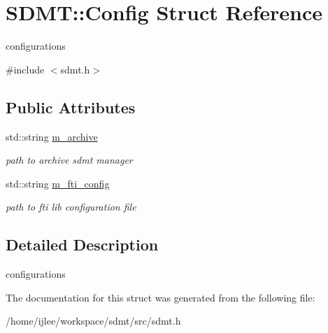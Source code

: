 \hypertarget{struct_s_d_m_t_1_1_config}{}\section{S\+D\+MT\+:\+:Config Struct Reference}
\label{struct_s_d_m_t_1_1_config}


configurations  




{\ttfamily \#include $<$sdmt.\+h$>$}

\subsection*{Public Attributes}
\begin{DoxyCompactItemize}
\item 
\mbox{\label{struct_s_d_m_t_1_1_config_a15ac2d93f153f5c3c3b557eb242bf43f}} 
std\+::string \hyperlink{struct_s_d_m_t_1_1_config_a15ac2d93f153f5c3c3b557eb242bf43f}{m\+\_\+archive}
\begin{DoxyCompactList}\small\item\em path to archive sdmt manager \end{DoxyCompactList}\item 
\mbox{\label{struct_s_d_m_t_1_1_config_a1508b4a0a71a7d172e3fb5834bd405a8}} 
std\+::string \hyperlink{struct_s_d_m_t_1_1_config_a1508b4a0a71a7d172e3fb5834bd405a8}{m\+\_\+fti\+\_\+config}
\begin{DoxyCompactList}\small\item\em path to fti lib configuration file \end{DoxyCompactList}\end{DoxyCompactItemize}


\subsection{Detailed Description}
configurations 

The documentation for this struct was generated from the following file\+:\begin{DoxyCompactItemize}
\item 
/home/ijlee/workspace/sdmt/src/sdmt.\+h\end{DoxyCompactItemize}
